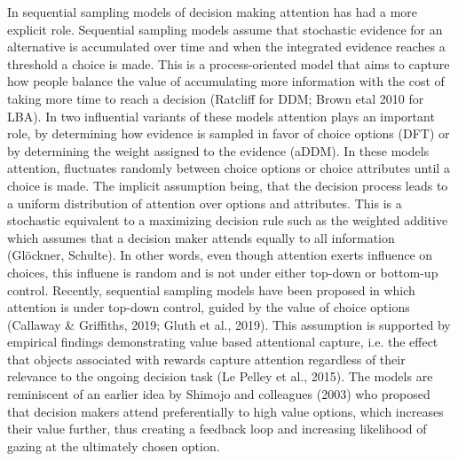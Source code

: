 \documentclass{article}
\begin{document}
In sequential sampling models of decision making attention has had a more explicit role. Sequential sampling models assume that stochastic evidence for an alternative is accumulated over time and when the integrated evidence reaches a threshold a choice is made. This is a process-oriented model that aims to capture how people balance the value of accumulating more information with the cost of taking more time to reach a decision (Ratcliff for DDM; Brown etal 2010 for LBA). In two influential variants of these models attention plays an important role, by determining how evidence is sampled in favor of choice options (DFT) or by determining the weight assigned to the evidence (aDDM). In these models attention, fluctuates randomly between choice options or choice attributes until a choice is made. The implicit assumption being, that the decision process leads to a uniform distribution of attention over options and attributes. This is a stochastic equivalent to a maximizing decision rule such as the weighted additive which assumes that a decision maker attends equally to all information (Glöckner, Schulte). In other words, even though attention exerts influence on choices, this influene is random and is not under either top-down or bottom-up control. Recently, sequential sampling models have been proposed in which attention is under top-down control, guided by the value of choice options (Callaway \& Griffiths, 2019; Gluth et al., 2019). This assumption is supported by empirical findings demonstrating value based attentional capture, i.e. the effect that objects associated with rewards capture attention regardless of their relevance to the ongoing decision task (Le Pelley et al., 2015). The models are reminiscent of an earlier idea by Shimojo and colleagues (2003) who proposed that decision makers attend preferentially to high value options, which increases their value further, thus creating a feedback loop and increasing likelihood of gazing at the ultimately chosen option. 
\end{document}
